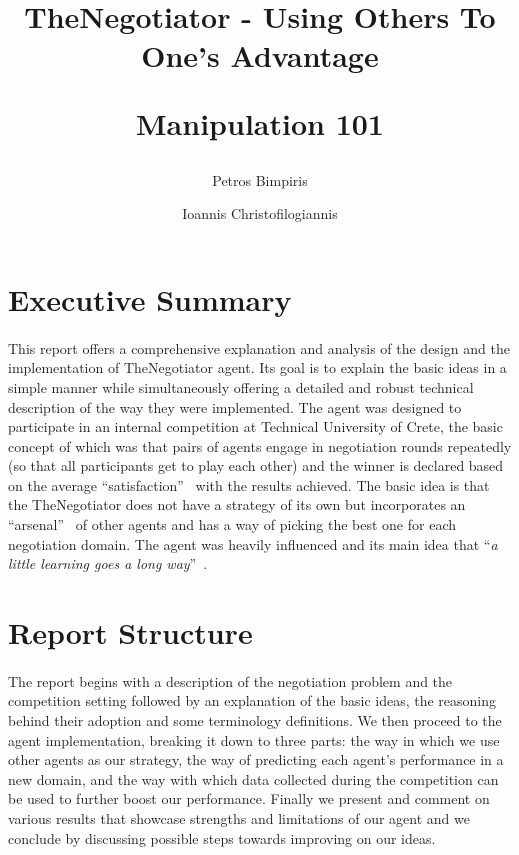 \documentclass[12pt]{article}
\author{%
	Petros Bimpiris
	\and
	Ioannis Christofilogiannis
}
\date{
	\begin{center}
	\hspace{2.5cm}Technical University of Crete
	\newline
	\phantom{-----------------}Multiagent Systems (COMP512)		%
	\newline
	February 2024 
	\end{center}
	\vspace{-0.5cm}
}
\title{
	\vspace{-2cm}
	\textbf{TheNegotiator - Using Others To One's Advantage}

	Manipulation 101
}
\numberwithin{equation}{section}
\newcommand{\quotes}[1]{\textquotedblleft #1\textquotedblright \ }
\begin{document}
 

	\maketitle

	\section*{Executive Summary}	\label{sec:execuctive_summary}		%

		\paragraph*{}
			This report offers a comprehensive explanation and analysis of the design and the implementation of TheNegotiator agent. Its goal is to explain the basic ideas in a simple manner while simultaneously offering a detailed and robust technical description of the way they were implemented.
			The agent was designed to participate in an internal competition at Technical University of Crete, the basic concept of which was that pairs of agents engage in negotiation rounds repeatedly (so that all participants get to play each other) and the winner is declared based on the average \quotes{satisfaction} with the results achieved.
			The basic idea is that the TheNegotiator does not have a strategy of its own but incorporates an \quotes{arsenal} of other agents and has a way of picking the best one for each negotiation domain. The agent was heavily influenced \cite{meta_agent_paper} and its main idea that \quotes{\emph{a little learning goes a long way}}.	%


	\section*{Report Structure}	\label{sec:report_structure}		%

		\paragraph*{}
			The report begins with a description of the negotiation problem and the competition setting followed by an explanation of the basic ideas, the reasoning behind their adoption and some terminology definitions.
			We then proceed to the agent implementation, breaking it down to three parts: the way in which we use other agents as our strategy, the way of predicting each agent's performance in a new domain, and the way with which data collected during the competition can be used to further boost our performance. Finally we present and comment on various results that showcase strengths and limitations of our agent and we conclude by discussing possible steps towards improving on our ideas.
			\hfill
\end{document}
